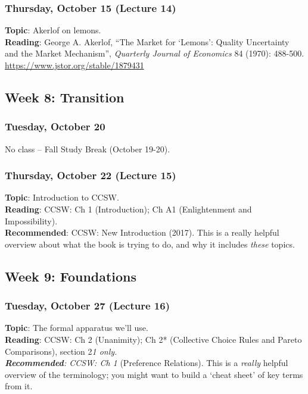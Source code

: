 \documentclass[
  letterpaper,
  DIV=11,
  numbers=noendperiod]{scrartcl}
\begin{document}
\subsubsection{Thursday, October 15 (Lecture
14)}\label{thursday-october-15-lecture-14}

\textbf{Topic}: Akerlof on lemons.\\
\textbf{Reading}: George A. Akerlof, ``The Market for `Lemons': Quality
Uncertainty and the Market Mechanism'', \emph{Quarterly Journal of
Economics} 84 (1970): 488-500.
\url{https://www.jstor.org/stable/1879431}

\subsection{Week 8: Transition}\label{week-8-transition}

\subsubsection{Tuesday, October 20}\label{tuesday-october-20}

No class -- Fall Study Break (October 19-20).

\subsubsection{Thursday, October 22 (Lecture
15)}\label{thursday-october-22-lecture-15}

\textbf{Topic}: Introduction to CCSW.\\
\textbf{Reading}: CCSW: Ch 1 (Introduction); Ch A1 (Enlightenment and
Impossibility).\\
\textbf{Recommended}: CCSW: New Introduction (2017). This is a really
helpful overview about what the book is trying to do, and why it
includes \emph{these} topics.

\subsection{Week 9: Foundations}\label{week-9-foundations}

\subsubsection{Tuesday, October 27 (Lecture
16)}\label{tuesday-october-27-lecture-16}

\textbf{Topic}: The formal apparatus we'll use.\\
\textbf{Reading}: CCSW: Ch 2 (Unanimity); Ch 2* (Collective Choice Rules
and Pareto Comparisons), section 2\emph{1 only.\\
\textbf{Recommended}: CCSW: Ch 1} (Preference Relations). This is a
\emph{really} helpful overview of the terminology; you might want to
build a `cheat sheet' of key terms from it.
\end{document}
